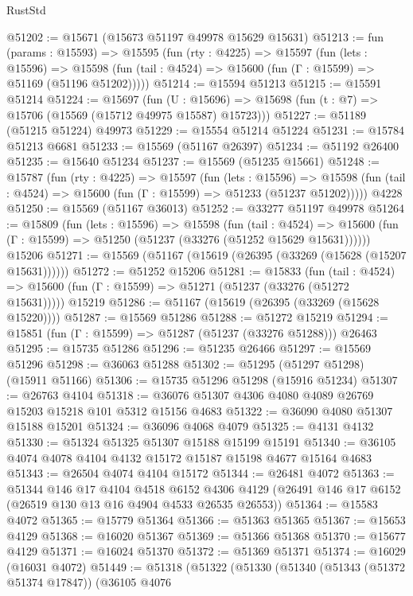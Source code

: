\begin{lexlean}{RustStd}
\begin{coremodule}
@51202 := @15671 (@15673 @51197 @49978 @15629 @15631)
@51213 := fun (params : @15593) =>
  @15595
    (fun (rty : @4225) =>
    @15597
      (fun (lets : @15596) =>
      @15598 (fun (tail : @4524) => @15600 (fun (Γ : @15599) => @51169 (@51196 @51202)))))
@51214 := @15594 @51213
@51215 := @15591 @51214
@51224 := @15697
    (fun (U : @15696) => @15698 (fun (t : @7) => @15706 (@15569 (@15712 @49975 @15587) @15723)))
@51227 := @51189 (@51215 @51224) @49973
@51229 := @15554 @51214 @51224
@51231 := @15784 @51213 @6681
@51233 := @15569 (@51167 @26397)
@51234 := @51192 @26400
@51235 := @15640 @51234
@51237 := @15569 (@51235 @15661)
@51248 := @15787
    (fun (rty : @4225) =>
    @15597
      (fun (lets : @15596) =>
      @15598 (fun (tail : @4524) => @15600 (fun (Γ : @15599) => @51233 (@51237 @51202)))))
    @4228
@51250 := @15569 (@51167 @36013)
@51252 := @33277 @51197 @49978
@51264 := @15809
    (fun (lets : @15596) =>
    @15598
      (fun (tail : @4524) =>
      @15600 (fun (Γ : @15599) => @51250 (@51237 (@33276 (@51252 @15629 @15631))))))
    @15206
@51271 := @15569 (@51167 (@15619 (@26395 (@33269 (@15628 (@15207 @15631))))))
@51272 := @51252 @15206
@51281 := @15833
    (fun (tail : @4524) => @15600 (fun (Γ : @15599) => @51271 (@51237 (@33276 (@51272 @15631)))))
    @15219
@51286 := @51167 (@15619 (@26395 (@33269 (@15628 @15220))))
@51287 := @15569 @51286
@51288 := @51272 @15219
@51294 := @15851 (fun (Γ : @15599) => @51287 (@51237 (@33276 @51288))) @26463
@51295 := @15735 @51286
@51296 := @51235 @26466
@51297 := @15569 @51296
@51298 := @36063 @51288
@51302 := @51295 (@51297 @51298) (@15911 @51166)
@51306 := @15735 @51296 @51298 (@15916 @51234)
@51307 := @26763 @4104
@51318 := @36076 @51307 @4306 @4080 @4089 @26769 @15203 @15218 @101 @5312 @15156 @4683
@51322 := @36090 @4080 @51307 @15188 @15201
@51324 := @36096 @4068 @4079
@51325 := @4131 @4132
@51330 := @51324 @51325 @51307 @15188 @15199 @15191
@51340 := @36105 @4074 @4078 @4104 @4132 @15172 @15187 @15198 @4677 @15164 @4683
@51343 := @26504 @4074 @4104 @15172
@51344 := @26481 @4072
@51363 := @51344
    @146
    @17
    @4104
    @4518
    @6152
    @4306
    @4129
    (@26491 @146 @17 @6152 (@26519 @130 @13 @16 @4904 @4533 @26535 @26553))
@51364 := @15583 @4072
@51365 := @15779 @51364
@51366 := @51363 @51365
@51367 := @15653 @4129
@51368 := @16020 @51367
@51369 := @51366 @51368
@51370 := @15677 @4129
@51371 := @16024 @51370
@51372 := @51369 @51371
@51374 := @16029 (@16031 @4072)
@51449 := @51318
    (@51322
      (@51330
        (@51340
          (@51343 (@51372 @51374 @17847))
          (@36105
            @4076

\end{coremodule}
\end{lexlean}
